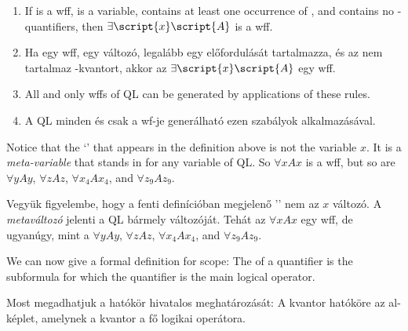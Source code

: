 \begin{enumerate}
\item If  is a wff,  is a variable,  contains at least one occurrence of , and  contains no -quantifiers, then $\exists\script{x}\script{A}$ is a wff.
\item Ha  egy wff,  egy változó,  legalább egy  előfordulását tartalmazza, és az  nem tartalmaz -kvantort, akkor az $\exists\script{x}\script{A}$ egy wff.

\item All and only wffs of QL can be generated by applications of these rules.
\item A QL minden és csak a wf-je generálható ezen szabályok alkalmazásával.
\end {enumerate}

Notice that the `' that appears in the definition above is not the variable $x$. It is a \emph{meta-variable} that stands in for any variable of QL. So $\forall xAx$ is a wff, but so are $\forall yAy$, $\forall zAz$, $\forall x_4Ax_4$, and $\forall z_9Az_9$.

Vegyük figyelembe, hogy a fenti definícióban megjelenő '' nem az $x$ változó. A \emph{metaváltozó} jelenti a QL bármely változóját. Tehát az $\forall xAx$ egy wff, de ugyanúgy, mint a $\forall yAy$, $\forall zAz$, $\forall x_4Ax_4$, and $\forall z_9Az_9$.

We can now give a formal definition for scope: The  of a quantifier is the subformula for which the quantifier is the main logical operator. 

Most megadhatjuk a hatókör hivatalos meghatározását: A kvantor hatóköre az al-képlet, amelynek a kvantor a fő logikai operátora.





